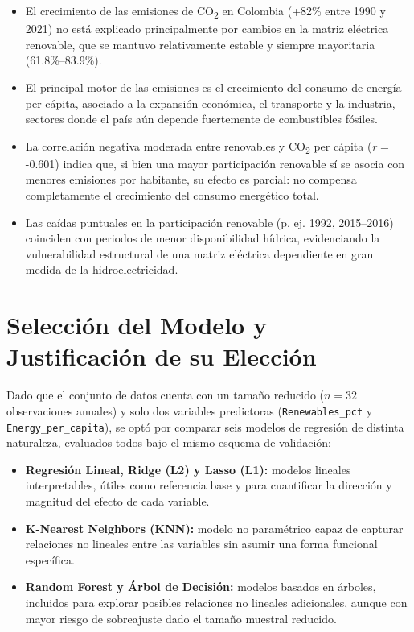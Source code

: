 \documentclass[11pt]{article}
\begin{document}
\begin{itemize}[leftmargin=1.2cm]
    \item El crecimiento de las emisiones de CO\textsubscript{2} en Colombia (+82\% entre 1990 y 2021) no está explicado principalmente por cambios en la matriz eléctrica renovable, que se mantuvo relativamente estable y siempre mayoritaria (61.8\%--83.9\%).
    \item El principal motor de las emisiones es el crecimiento del consumo de energía per cápita, asociado a la expansión económica, el transporte y la industria, sectores donde el país aún depende fuertemente de combustibles fósiles.
    \item La correlación negativa moderada entre renovables y CO\textsubscript{2} per cápita (\textit{r} = -0.601) indica que, si bien una mayor participación renovable sí se asocia con menores emisiones por habitante, su efecto es parcial: no compensa completamente el crecimiento del consumo energético total.
    \item Las caídas puntuales en la participación renovable (p. ej. 1992, 2015--2016) coinciden con periodos de menor disponibilidad hídrica, evidenciando la vulnerabilidad estructural de una matriz eléctrica dependiente en gran medida de la hidroelectricidad.
\end{itemize}

\section{Selección del Modelo y Justificación de su Elección}

Dado que el conjunto de datos cuenta con un tamaño reducido ($n=32$ observaciones anuales) y solo dos variables predictoras (\texttt{Renewables\_pct} y \texttt{Energy\_per\_capita}), se optó por comparar seis modelos de regresión de distinta naturaleza, evaluados todos bajo el mismo esquema de validación:

\begin{itemize}[leftmargin=1.2cm]
    \item \textbf{Regresión Lineal, Ridge (L2) y Lasso (L1):} modelos lineales interpretables, útiles como referencia base y para cuantificar la dirección y magnitud del efecto de cada variable.
    \item \textbf{K-Nearest Neighbors (KNN):} modelo no paramétrico capaz de capturar relaciones no lineales entre las variables sin asumir una forma funcional específica.
    \item \textbf{Random Forest y Árbol de Decisión:} modelos basados en árboles, incluidos para explorar posibles relaciones no lineales adicionales, aunque con mayor riesgo de sobreajuste dado el tamaño muestral reducido.
\end{itemize}
\end{document}
